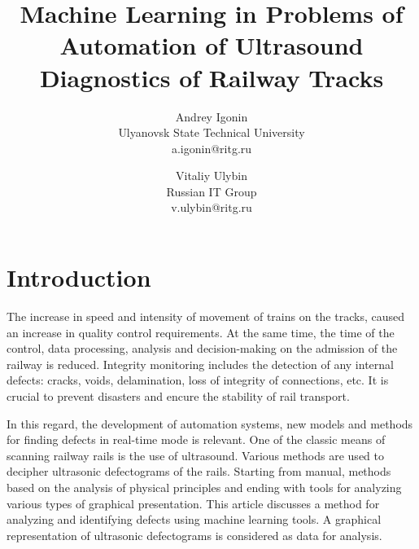\documentclass[a4paper, 12pt]{article}
\begin{document}
\title{Machine Learning in Problems of Automation of Ultrasound Diagnostics of Railway Tracks}
\author{Andrey Igonin \\ Ulyanovsk State Technical University \\ a.igonin@ritg.ru \and Vitaliy Ulybin \\ Russian IT Group \\ v.ulybin@ritg.ru}
\date{}
\maketitle



\section{Introduction}

The increase in speed and intensity of movement of trains on the tracks, caused an increase in quality control requirements. At the same time, the time of the control, data processing, analysis and decision-making on the admission of the railway is reduced. Integrity monitoring includes the detection of any internal defects: cracks, voids, delamination, loss of integrity of connections, etc. It is crucial to prevent disasters and encure the stability of rail transport.

In this regard, the development of automation systems, new models and methods for finding defects in real-time mode is relevant. One of the classic means of scanning railway rails is the use of ultrasound. Various methods are used to decipher ultrasonic defectograms of the rails. Starting from manual, methods based on the analysis of physical principles and ending with tools for analyzing various types of graphical presentation. This article discusses a method for analyzing and identifying defects using machine learning tools. A graphical representation of ultrasonic defectograms is considered as data for analysis.
\end{document}
